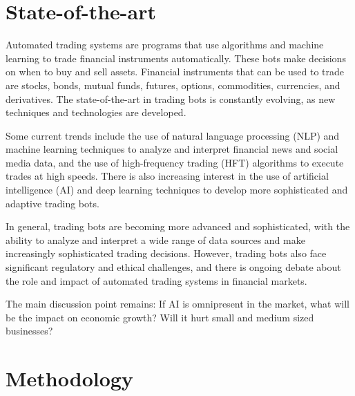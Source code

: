 \section{State-of-the-art}%
\label{sec:state-of-the-art}

Automated trading systems are programs that use algorithms and machine learning to trade financial instruments automatically. These bots make decisions on when to buy and sell assets. Financial instruments that can be used to trade are stocks, bonds, mutual funds, futures, options, commodities, currencies, and derivatives. The state-of-the-art in trading bots is constantly evolving, as new techniques and technologies are developed.

Some current trends include the use of natural language processing (NLP) and machine learning techniques to analyze and interpret financial news and social media data, and the use of high-frequency trading (HFT) algorithms to execute trades at high speeds. There is also increasing interest in the use of artificial intelligence (AI) and deep learning techniques to develop more sophisticated and adaptive trading bots.

In general, trading bots are becoming more advanced and sophisticated, with the ability to analyze and interpret a wide range of data sources and make increasingly sophisticated trading decisions.\autocite{Ferreira_2021} However, trading bots also face significant regulatory and ethical challenges, and there is ongoing debate about the role and impact of automated trading systems in financial markets. 

The main discussion point remains: If AI is omnipresent in the market, what will be the impact on economic growth? Will it hurt small and medium sized businesses?




\section{Methodology}%
\label{sec:methodologie}

